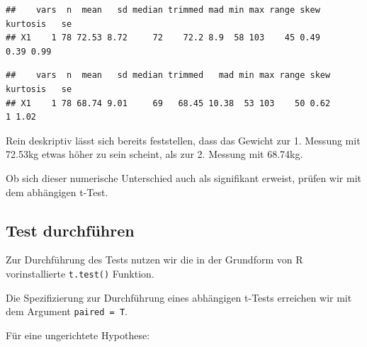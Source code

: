 \documentclass[
]{book}
\newenvironment{Shaded}{\begin{snugshade}}{\end{snugshade}}
\newcommand{\AttributeTok}[1]{\textcolor[rgb]{0.77,0.63,0.00}{#1}}
\newcommand{\FunctionTok}[1]{\textcolor[rgb]{0.00,0.00,0.00}{#1}}
\newcommand{\NormalTok}[1]{#1}
\newcommand{\SpecialCharTok}[1]{\textcolor[rgb]{0.00,0.00,0.00}{#1}}
\begin{document}
\begin{Shaded}
\end{Shaded}

\begin{verbatim}
##    vars  n  mean   sd median trimmed mad min max range skew kurtosis   se
## X1    1 78 72.53 8.72     72    72.2 8.9  58 103    45 0.49     0.39 0.99
\end{verbatim}

\begin{Shaded}
\end{Shaded}

\begin{verbatim}
##    vars  n  mean   sd median trimmed   mad min max range skew kurtosis   se
## X1    1 78 68.74 9.01     69   68.45 10.38  53 103    50 0.62        1 1.02
\end{verbatim}

Rein deskriptiv lässt sich bereits feststellen, dass das Gewicht zur 1. Messung mit 72.53kg etwas höher zu sein scheint, als zur 2. Messung mit 68.74kg.

Ob sich dieser numerische Unterschied auch als signifikant erweist, prüfen wir mit dem abhängigen t-Test.

\hypertarget{test-durchfuxfchren-2}{%
\subsection{Test durchführen}\label{test-durchfuxfchren-2}}

Zur Durchführung des Tests nutzen wir die in der Grundform von R vorinstallierte \texttt{t.test()} Funktion.

Die Spezifizierung zur Durchführung eines abhängigen t-Tests erreichen wir mit dem Argument \texttt{paired\ =\ T}.

Für eine ungerichtete Hypothese:

\begin{Shaded}
\end{Shaded}
\end{document}
